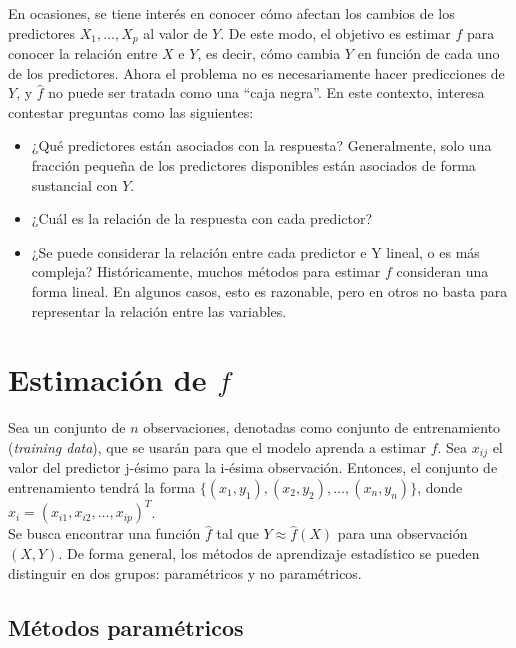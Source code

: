 En ocasiones, se tiene interés en conocer cómo afectan los cambios de los predictores $X_1, \dots, X_p$ al valor de $Y$. De este modo, el objetivo es estimar $f$ para conocer la relación entre $X$ e $Y$, es decir, cómo cambia $Y$ en función de cada uno de los predictores. Ahora el problema no es necesariamente hacer predicciones de $Y$, y $\hat{f}$ no puede ser tratada como una ``caja negra''. En este contexto, interesa contestar preguntas como las siguientes:
\begin{itemize}
\item ¿Qué predictores están asociados con la respuesta? Generalmente, solo una fracción pequeña de los predictores disponibles están asociados de forma sustancial con $Y$.
\item ¿Cuál es la relación de la respuesta con cada predictor?
\item ¿Se puede considerar la relación entre cada predictor e Y lineal, o es más compleja? Históricamente, muchos métodos para estimar $f$ consideran una forma lineal. En algunos casos, esto es razonable, pero en otros no basta para representar la relación entre las variables.
\end{itemize}

\section{Estimación de $f$}

Sea un conjunto de $n$ observaciones, denotadas como conjunto de entrenamiento (\textit{training data}), que se usarán para que el modelo aprenda a estimar $f$. Sea $x_{ij}$ el valor del predictor j-ésimo para la i-ésima observación. Entonces, el conjunto de entrenamiento tendrá la forma $\{(x_1, y_1), (x_2, y_2), \dots, (x_n, y_n)\}$, donde $x_i = (x_{i1}, x_{i2}, \dots, x_{ip})^T$. \\

Se busca encontrar una función $\hat{f}$ tal que $Y \approx \hat{f} (X)$ para una observación $(X, Y)$. De forma general, los métodos de aprendizaje estadístico se pueden distinguir en dos grupos: paramétricos y no paramétricos.

\subsection{Métodos paramétricos}

